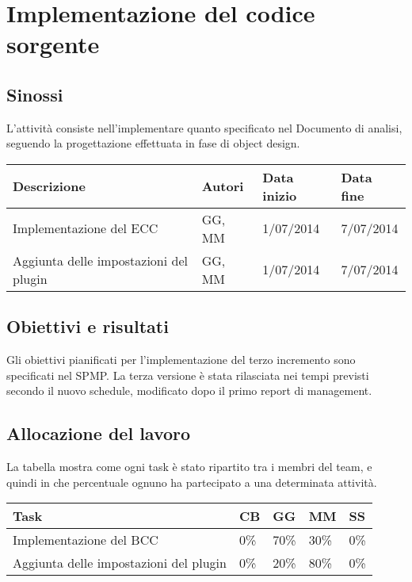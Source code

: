\section{Implementazione del codice sorgente}
\subsection{Sinossi}
L'attività consiste nell'implementare quanto specificato nel Documento di analisi, seguendo la progettazione effettuata in fase di object design.

\begin{table}[ht]
 \begin{tabular}{|p{6cm}|p{2cm}|p{2cm}|p{2cm}|}
    \hline
    \rowcolor{Gray}\textbf{Descrizione}			& \textbf{Autori}		& \textbf{Data inizio}			& \textbf{Data fine}	\\
    \hline
    Implementazione del ECC				& GG, MM			& 1/07/2014				& 7/07/2014		\\
    \hline
    Aggiunta delle impostazioni del plugin		& GG, MM			& 1/07/2014				& 7/07/2014		\\
    \hline
 \end{tabular}
\end{table}

\subsection{Obiettivi e risultati}
Gli obiettivi pianificati per l'implementazione del terzo incremento sono specificati nel SPMP. La terza versione è stata rilasciata nei tempi previsti secondo il nuovo schedule, modificato dopo il primo report di management.

\subsection{Allocazione del lavoro}
La tabella mostra come ogni task è stato ripartito tra i membri del team, e quindi in che percentuale ognuno ha partecipato a una determinata attività.
\begin{table}[ht]
 \centering
 \begin{tabular}{|p{7.5cm}|p{1cm}|p{1cm}|p{1cm}|p{1cm}|}
  \hline
  \rowcolor{Gray}\textbf{Task}			& \textbf{CB}		& \textbf{GG}		& \textbf{MM}		& \textbf{SS}		\\
  \hline
  Implementazione del BCC			& 0\%			& 70\%			& 30\%			& 0\%			\\
  \hline
  Aggiunta delle impostazioni del plugin	& 0\%			& 20\%			& 80\%			& 0\%			\\
  \hline
 \end{tabular}
\end{table}




